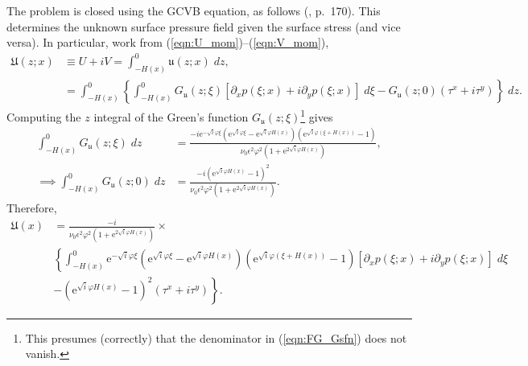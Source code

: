 \documentclass[10pt]{amsart}
\begin{document}
The problem is closed using the GCVB equation, as follows (\citealt{salmon98}, p.~170).
This determines the unknown surface pressure field given the surface stress (and vice versa).
In particular, work from (\ref{eqn:U_mom})--(\ref{eqn:V_mom}),
\begin{align}
\mathfrak{U} (z;x) & \equiv U + i V = \int_{-H(x)}^{0} \mathfrak{u} (z;x) \; dz , \label{eqn:depth_integrated_flow_def} \\
& = \int_{-H(x)}^0 \left\{ \int_{-H(x)}^{0} G_{ \mathfrak{u}} (z; \xi) \left[ \partial_x p( \xi; x) + i \partial_y p( \xi; x) \right] \; d \xi 
-  G_{\mathfrak{u}} (z; 0)  \left( \tau^x + i \tau^y \right)  \right\} \; dz.
\end{align}
Computing the $z$ integral of the Green's function $G_{\mathfrak{u}} (z; \xi)$\footnote{This presumes (correctly) that the denominator in (\ref{eqn:FG_Gsfn}) does not vanish.} gives 
\begin{align}
\int_{-H(x)}^0 G_{ \mathfrak{u}}(z;\xi) \; dz & = 
\frac{- i \mathrm{e}^{-\sqrt{i} \varphi \xi} 
\left(
\mathrm{e}^{\sqrt{i} \varphi \xi} - 
\mathrm{e}^{\sqrt{i} \varphi H(x)} 
\right) \left(
\mathrm{e}^{\sqrt{i} \varphi  \left( \xi + H(x) \right)} - 1
\right)
} { \nu_0 \epsilon^2 \varphi^2  \left(1 + \mathrm{e}^{2 \sqrt{i} \varphi H(x )} \right)} , \nonumber \\
\implies \int_{-H(x)}^0 G_{ \mathfrak{u}}(z;0) \; dz & = 
\frac{ - i \left( 
\mathrm{e}^{\sqrt{i} \varphi  H(x) }   - 1   
\right)^2
} { \nu_0 \epsilon^2 \varphi^2  \left(1 + \mathrm{e}^{2 \sqrt{i} \varphi H(x )} \right)} .
\end{align}
Therefore,
\begin{align}
\mathfrak{U} (x) & = 
\frac{-i }{{ \nu_0 \epsilon^2 \varphi^2  \left(1 + \mathrm{e}^{2 \sqrt{i} \varphi H(x )} \right)} } \times \nonumber \\
&\left\{
 \int_{-H(x)}^{0} 
\mathrm{e}^{-\sqrt{i} \varphi \xi} 
\left(
\mathrm{e}^{\sqrt{i} \varphi \xi} - 
\mathrm{e}^{\sqrt{i} \varphi H(x)} 
\right) \left(
\mathrm{e}^{\sqrt{i} \varphi  \left( \xi + H(x) \right)} - 1
\right)
 \left[ \partial_x p( \xi; x) + i \partial_y p( \xi; x) \right] \; d \xi  \right. \nonumber  \\
& - \left.
\left( 
\mathrm{e}^{\sqrt{i} \varphi  H(x) }   - 1   
\right)^2
\left( \tau^x + i \tau^y \right)   \right\}.
\label{eqn:UV_expression}
\end{align}
\end{document}
